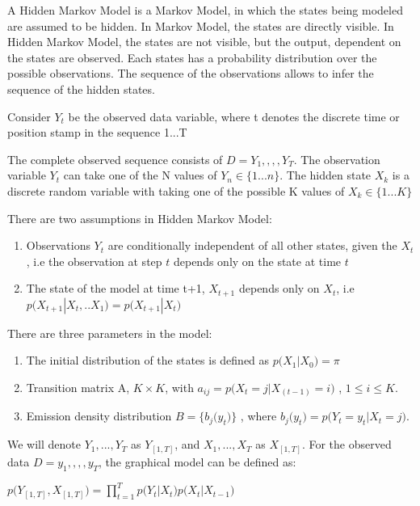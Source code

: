 \documentclass{article} %
\begin{document}
A Hidden Markov Model is a Markov Model, in which the states being modeled are assumed to be hidden. In Markov Model, the states are directly visible. In Hidden Markov Model, the states are not visible, but the output, dependent on the states are observed. Each states has a probability distribution over the possible observations. The sequence of the observations allows to infer the sequence of the hidden states. 

Consider \(Y_t\) be the observed data variable, where t denotes the discrete time or position stamp in the sequence 1...T

The complete observed sequence consists of \(D ={Y_1,,,,Y_T}\). The observation variable $Y_t$ can take one of the N values of \(Y_n \in \{1...n\}\). The hidden state \(X_k\) is a discrete random variable with taking one of the possible K values of \(X_k \in \{1...K\}\)

There are two assumptions in Hidden Markov Model:
\begin{enumerate}
\item Observations $Y_t$ are conditionally independent of all other states, given the \(X_t\), i.e the observation at step \(t\) depends only on the state at time \(t\)
\item The state of the model at time t+1, \(X_{t+1}\) depends only on \(X_t\), i.e 
\( p\big(X_{t+1}|X_t,..X_1\big) = p\big(X_{t+1}|X_t\big) \)
\end{enumerate}

There are three parameters in the model:
\begin{enumerate}
\item The initial distribution of the states is defined as \(p\big(X_1|X_0 \big) = \pi\)
\item Transition matrix A, \(K \times K \), with \(a_{ij} = p\big(X_t=j|X_(t-1)=i\big)\) , \(1\leq i \leq K \).
\item Emission density distribution \(B = \{b_{j}\big(y_t\big)\}\) , where \(b_{j}\big(y_t\big) = p\big(Y_t=y_t|X_t=j\big)\).
\end{enumerate}

We will denote \(Y_1,...,Y_T\) as \(Y_{[1,T]}\), and \(X_1,...,X_T\) as \(X_{[1,T]}\). For the observed data \(D ={y_1,,,,y_T}\), the graphical model can be defined as:

\begin{center} \(  p\big( Y_{[1,T]}, X_{[1,T]} \big) = \prod_{t=1}^{T}p\big(Y_t|X_t\big)p\big(X_t|X_{t-1}\big)  \)
\end{center}
\end{document}
